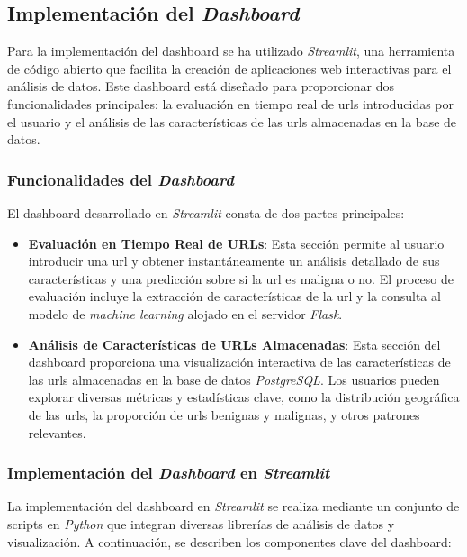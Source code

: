 \subsection{Implementación del \textit{Dashboard}}

Para la implementación del \gls{dashboard} se ha utilizado \textit{Streamlit}, una herramienta de código abierto que facilita la creación de aplicaciones web interactivas para el análisis de datos. Este \gls{dashboard} está diseñado para proporcionar dos funcionalidades principales: la evaluación en tiempo real de \glspl{url} introducidas por el usuario y el análisis de las características de las \glspl{url} almacenadas en la base de datos.

\subsubsection*{Funcionalidades del \textit{Dashboard}}

El \gls{dashboard} desarrollado en \textit{Streamlit} consta de dos partes principales:

\begin{itemize}
    \item \textbf{Evaluación en Tiempo Real de URLs}: Esta sección permite al usuario introducir una \gls{url} y obtener instantáneamente un análisis detallado de sus características y una predicción sobre si la \gls{url} es maligna o no. El proceso de evaluación incluye la extracción de características de la \gls{url} y la consulta al modelo de \textit{machine learning} alojado en el servidor \textit{Flask}.

    \item \textbf{Análisis de Características de URLs Almacenadas}: Esta sección del \gls{dashboard} proporciona una visualización interactiva de las características de las \glspl{url} almacenadas en la base de datos \textit{PostgreSQL}. Los usuarios pueden explorar diversas métricas y estadísticas clave, como la distribución geográfica de las \glspl{url}, la proporción de \glspl{url} benignas y malignas, y otros patrones relevantes.
\end{itemize}

\subsubsection*{Implementación del \textit{Dashboard} en \textit{Streamlit}}

La implementación del \gls{dashboard} en \textit{Streamlit} se realiza mediante un conjunto de scripts en \textit{Python} que integran diversas librerías de análisis de datos y visualización. A continuación, se describen los componentes clave del \gls{dashboard}:


